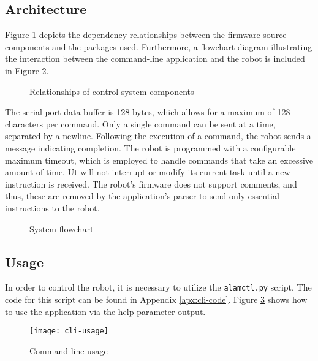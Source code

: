 \subsection{Architecture}

Figure \ref{fig:firmware-uml} depicts the dependency relationships between the firmware source components and the packages used. Furthermore, a flowchart diagram illustrating the interaction between the command-line application and the robot is included in Figure \ref{fig:system-flowchart}.

\begin{figure}[H]
    \centering
    
    \caption{Relationships of control system components}
    \label{fig:firmware-uml}
\end{figure}


The serial port data buffer is 128 bytes, which allows for a maximum of 128 characters per command. Only a single command can be sent at a time, separated by a newline. Following the execution of a command, the robot sends a message indicating completion. The robot is programmed with a configurable maximum timeout, which is employed to handle commands that take an excessive amount of time. Ut will not interrupt or modify its current task until a new instruction is received. The robot's firmware does not support comments, and thus, these are removed by the application's parser to send only essential instructions to the robot.

\begin{figure}[H]
    \centering
    
    \caption{System flowchart}
    \label{fig:system-flowchart}
\end{figure}


\subsection{Usage}

In order to control the robot, it is necessary to utilize the \texttt{alamctl.py} script. The code for this script can be found in Appendix \ref{apx:cli-code}. Figure \ref{fig:cli-usage} shows how to use the application via the help parameter output.


\begin{figure}[H]
    \centering
    \texttt{[image: cli-usage]}
    \caption{Command line usage}
    \label{fig:cli-usage}
\end{figure}

